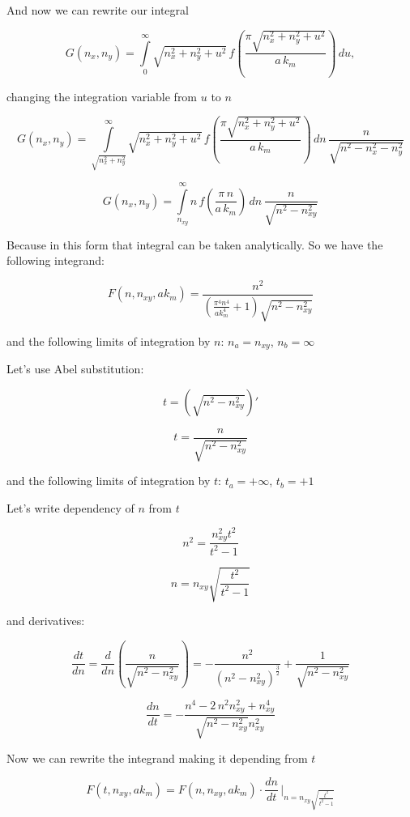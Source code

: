 \documentclass[11pt]{article}
\begin{document}
    And now we can rewrite our integral

    \[G\left(n_x, n_y\right) = \int\limits_{0}^{\infty}\sqrt{n_x^2 + n_y^2+u^2}\,
f\left(\frac{\pi\sqrt{n_x^2 + n_y^2+u^2}}{a\,k_m}\right)\,d{u}, 
\]

changing the integration variable from \(u\) to \(n\)

    \[
G\left(n_x, n_y\right) = \int\limits_{\sqrt{n_x^2 + n_y^2}}^{\infty}\sqrt{n_x^2 + n_y^2+u^2}\,
f\left(\frac{\pi\sqrt{n_x^2 + n_y^2+u^2}}{a\,k_m}\right)\,dn\,{\frac{n}{\sqrt{n^{2} - n_{x}^{2} - n_{y}^{2}}}}
\]

    \[
G\left(n_x, n_y\right) = \int\limits_{n_{xy}}^{\infty}n\,
f\left(\frac{\pi\,n}{a\,k_m}\right)\,dn\,{\frac{n}{\sqrt{n^{2} - n_{xy}^{2}}}}
\]

    Because in this form that integral can be taken analytically. So we have
the following integrand:

    \[F\left(n, n_{xy}, ak_m\right) = \frac{n^{2}}{{\left(\frac{\pi^{4} n^{4}}{\mathit{ak}_{m}^{4}} + 1\right)} \sqrt{n^{2} - n_{\mathit{xy}}^{2}}}\]

    and the following limits of integration by \(n\): \(n_a = n_{xy}\),
\(n_b = \infty\)

    Let's use Abel substitution:

\[t = \left(\sqrt{n^2-n_{xy}^2}\right)'\]

    \[t = \frac{n}{\sqrt{n^{2} - n_{\mathit{xy}}^{2}}}\]

    and the following limits of integration by \(t\): \(t_a = +\infty\),
\(t_b = +1\)

    Let's write dependency of \(n\) from \(t\)

    \[n^{2} = \frac{n_{\mathit{xy}}^{2} t^{2}}{t^{2} - 1}\]

    \[n = n_{\mathit{xy}} \sqrt{\frac{t^{2}}{t^{2} - 1}}\]

    and derivatives:

    \[\frac{dt}{dn} = \frac{d}{dn} \left( \frac{n}{\sqrt{n^{2} - n_{\mathit{xy}}^{2}}} \right)= -\frac{n^{2}}{{\left(n^{2} - n_{\mathit{xy}}^{2}\right)}^{\frac{3}{2}}} + \frac{1}{\sqrt{n^{2} - n_{\mathit{xy}}^{2}}}\]

    \[\frac{dn}{dt} = -\frac{n^{4} - 2 \, n^{2} n_{\mathit{xy}}^{2} + n_{\mathit{xy}}^{4}}{\sqrt{n^{2} - n_{\mathit{xy}}^{2}} n_{\mathit{xy}}^{2}}\]

    Now we can rewrite the integrand making it depending from \(t\)

    \[F\left(t, n_{xy}, ak_m\right) = F\left(n, n_{xy}, ak_m\right) \cdot \frac{dn}{dt} \, \Bigg\rvert_{ n = n_{\mathit{xy}} \sqrt{\frac{t^{2}}{t^{2} - 1}} }\]
\end{document}
